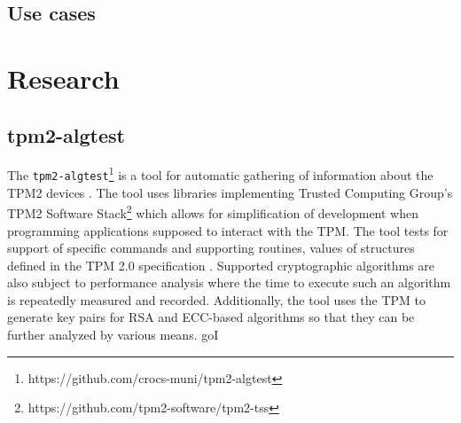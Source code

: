 \subsection{Use cases}




\section{Research}


\subsection{tpm2-algtest}
The \texttt{tpm2-algtest}\footnote{https://github.com/crocs-muni/tpm2-algtest} is a tool for automatic gathering of information about the TPM2 devices \cite{Struk2019thesis}. The tool uses libraries implementing Trusted Computing Group's TPM2 Software Stack\footnote{https://github.com/tpm2-software/tpm2-tss} which allows for simplification of development when programming applications supposed to interact with the TPM. The tool tests for support of specific commands and supporting routines, values of structures defined in the TPM 2.0 specification \cite{tcg_p3_commands, tcg_p4_supproutines, tcg_p2_structures}. Supported cryptographic algorithms are also subject to performance analysis where the time to execute such an algorithm is repeatedly measured and recorded. Additionally, the tool uses the TPM to generate key pairs for RSA and ECC-based algorithms so that they can be further analyzed by various means.
goI
